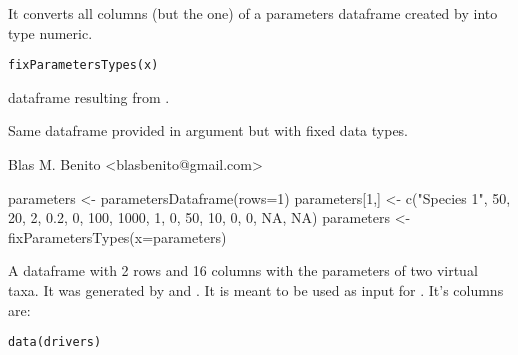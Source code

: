 \documentclass[letterpaper]{book}
\begin{document}
%
\begin{Description}\relax
It converts all columns (but the  one) of a parameters dataframe created by  into type numeric.
\end{Description}
%
\begin{Usage}
\begin{verbatim}
fixParametersTypes(x)
\end{verbatim}
\end{Usage}
%
\begin{Arguments}
\begin{ldescription}
\item[\code{x}] dataframe resulting from .
\end{ldescription}
\end{Arguments}
%
\begin{Value}
Same dataframe provided in argument  but with fixed data types.
\end{Value}
%
\begin{Author}\relax
Blas M. Benito  <blasbenito@gmail.com>
\end{Author}
%
\begin{SeeAlso}\relax
{}
\end{SeeAlso}
%
\begin{Examples}
\begin{ExampleCode}

parameters <- parametersDataframe(rows=1)
parameters[1,] <- c("Species 1", 50, 20, 2, 0.2, 0, 100, 1000, 1, 0, 50, 10, 0, 0, NA, NA)
parameters <- fixParametersTypes(x=parameters)

\end{ExampleCode}
\end{Examples}
%
\begin{Description}\relax
A dataframe with 2 rows and 16 columns with the parameters of two virtual taxa. It was generated by  and . It is meant to be used as input for . It's columns are:
\end{Description}
%
\begin{Usage}
\begin{verbatim}
data(drivers)
\end{verbatim}
\end{Usage}
\end{document}
